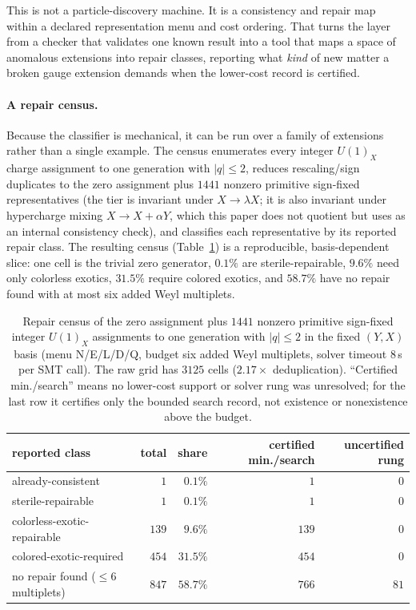 \documentclass[11pt]{article}
\newcommand{\UX}{U(1)_X}
\begin{document}
This is not a particle-discovery machine. It is a consistency and repair map
within a declared representation menu and cost ordering. That turns the layer
from a checker that validates one known result into a tool that maps a space of
anomalous extensions into repair classes, reporting what \emph{kind} of new
matter a broken gauge extension demands when the lower-cost record is certified.

\paragraph{A repair census.}
Because the classifier is mechanical, it can be run over a family of extensions
rather than a single example. The census enumerates every integer $\UX$ charge
assignment to one generation with $|q|\le 2$, reduces rescaling/sign duplicates
to the zero assignment plus $1441$ nonzero primitive sign-fixed representatives
(the tier is invariant under $X\to\lambda X$; it is also invariant under
hypercharge mixing $X\to X+\alpha Y$, which this paper does not quotient but
uses as an internal consistency check), and classifies each representative by
its reported repair class. The
resulting census (Table~\ref{tab:census}) is a reproducible, basis-dependent
slice: one cell is the trivial zero generator, $0.1\%$ are sterile-repairable,
$9.6\%$ need only colorless exotics, $31.5\%$ require colored exotics, and
$58.7\%$ have no repair found with at most six added Weyl multiplets.

\begin{table}[t]
\centering
\small
\begin{tabular}{@{}lrrrr@{}}
\toprule
reported class & total & share & certified min./search & uncertified rung\\
\midrule
already-consistent & $1$ & $0.1\%$ & $1$ & $0$\\
sterile-repairable & $1$ & $0.1\%$ & $1$ & $0$\\
colorless-exotic-repairable & $139$ & $9.6\%$ & $139$ & $0$\\
colored-exotic-required & $454$ & $31.5\%$ & $454$ & $0$\\
no repair found ($\le6$ multiplets) & $847$ & $58.7\%$ & $766$ & $81$\\
\bottomrule
\end{tabular}
\caption{Repair census of the zero assignment plus $1441$ nonzero
primitive sign-fixed integer $\UX$ assignments to one generation with $|q|\le2$
in the fixed $(Y,X)$ basis (menu N/E/L/D/Q, budget six added Weyl multiplets,
solver timeout $8\,$s per SMT call). The raw grid has $3125$ cells ($2.17\times$
deduplication). ``Certified min./search'' means no lower-cost support or solver
rung was unresolved; for the last row it certifies only the bounded search
record, not existence or nonexistence above the budget.}
\label{tab:census}
\end{table}
\end{document}
